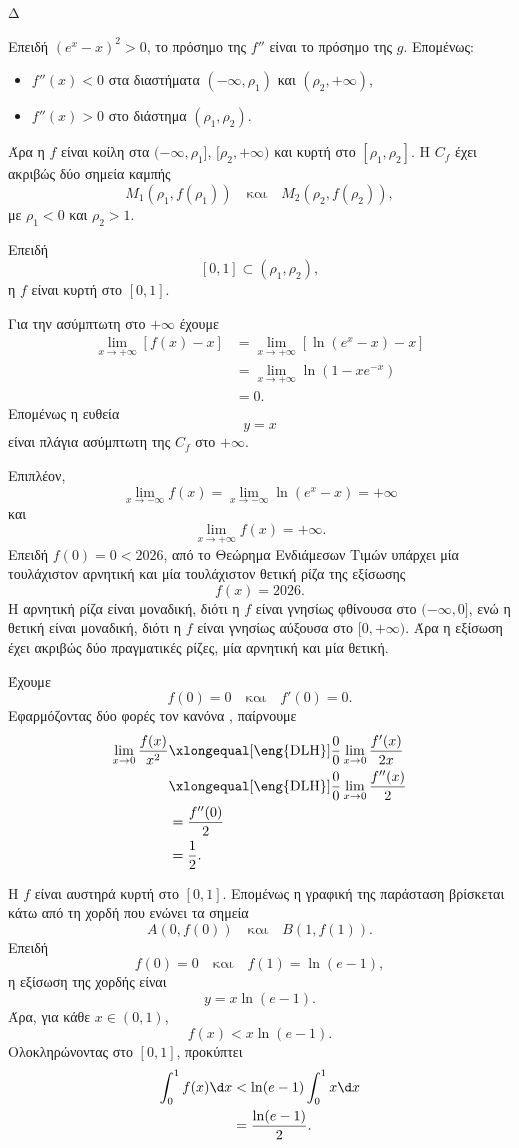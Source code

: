 \begin{thema}{Δ}
\begin{erwthma}
Επειδή $(e^x-x)^2>0$, το πρόσημο της $f''$ είναι το πρόσημο της $g$. Επομένως:
\begin{itemize}
\item $f''(x)<0$ στα διαστήματα $(-\infty,\rho_1)$ και $(\rho_2,+\infty)$,
\item $f''(x)>0$ στο διάστημα $(\rho_1,\rho_2)$.
\end{itemize}
Άρα η $f$ είναι κοίλη στα $(-\infty,\rho_1]$, $[\rho_2,+\infty)$ και κυρτή στο $[\rho_1,\rho_2]$. Η $C_f$ έχει ακριβώς δύο σημεία καμπής
\[
{M_1\left(\rho_1,f(\rho_1)\right)}
\quad\text{και}\quad
{M_2\left(\rho_2,f(\rho_2)\right)},
\]
με $\rho_1<0$ και $\rho_2>1$.

Επειδή
\[
[0,1]\subset(\rho_1,\rho_2),
\]
η $f$ είναι κυρτή στο $[0,1]$.

\item Για την ασύμπτωτη στο $+\infty$ έχουμε
\begin{align*}
\lim_{x\to+\infty}\left[f(x)-x\right]
&=\lim_{x\to+\infty}
\left[\ln(e^x-x)-x\right]\\
&=\lim_{x\to+\infty}
\ln\left(1-xe^{-x}\right)\\
&=0.
\end{align*}
Επομένως η ευθεία
\[
{y=x}
\]
είναι πλάγια ασύμπτωτη της $C_f$ στο $+\infty$.

Επιπλέον,
\[
\lim_{x\to-\infty}f(x)
=\lim_{x\to-\infty}\ln(e^x-x)
=+\infty
\]
και
\[
\lim_{x\to+\infty}f(x)=+\infty.
\]
Επειδή $f(0)=0<2026$, από το Θεώρημα Ενδιάμεσων Τιμών υπάρχει μία τουλάχιστον αρνητική και μία τουλάχιστον θετική ρίζα της εξίσωσης
\[
f(x)=2026.
\]
Η αρνητική ρίζα είναι μοναδική, διότι η $f$ είναι γνησίως φθίνουσα στο $(-\infty,0]$, ενώ η θετική είναι μοναδική, διότι η $f$ είναι γνησίως αύξουσα στο $[0,+\infty)$. Άρα η εξίσωση έχει ακριβώς δύο πραγματικές ρίζες, μία αρνητική και μία θετική.

\item Έχουμε
\[
f(0)=0
\quad\text{και}\quad
f'(0)=0.
\]
Εφαρμόζοντας δύο φορές τον κανόνα , παίρνουμε
\begin{align*}
\lim_{x\to0}\frac{f(x)}{x^2}
&\xlongequal[\text{\eng{DLH}}]{\frac{0}{0}}
\lim_{x\to0}\frac{f'(x)}{2x}\\
&\xlongequal[\text{\eng{DLH}}]{\frac{0}{0}}
\lim_{x\to0}\frac{f''(x)}{2}\\
&=\frac{f''(0)}{2}\\
&={\frac{1}{2}}.
\end{align*}

Η $f$ είναι αυστηρά κυρτή στο $[0,1]$. Επομένως η γραφική της παράσταση βρίσκεται κάτω από τη χορδή που ενώνει τα σημεία
\[
A(0,f(0))
\quad\text{και}\quad
B(1,f(1)).
\]
Επειδή
\[
f(0)=0
\quad\text{και}\quad
f(1)=\ln(e-1),
\]
η εξίσωση της χορδής είναι
\[
y=x\ln(e-1).
\]
Άρα, για κάθε $x\in(0,1)$,
\[
f(x)<x\ln(e-1).
\]
Ολοκληρώνοντας στο $[0,1]$, προκύπτει
\begin{align*}
\int_0^1f(x)\d x
&<\ln(e-1)\int_0^1x\d x\\
&={\frac{\ln(e-1)}{2}}.
\end{align*}
\end{erwthma}
\end{thema}
